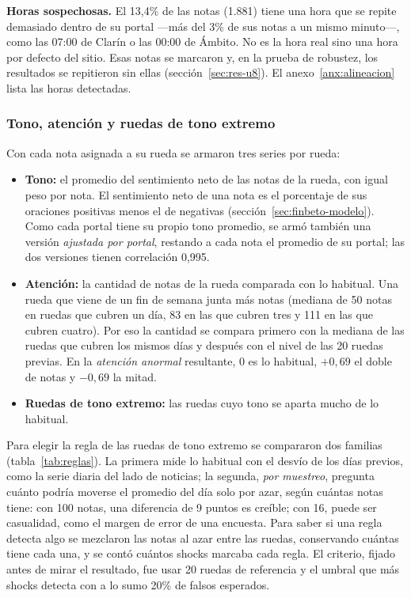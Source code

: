 \textbf{Horas sospechosas.} El 13,4\% de las notas (1.881) tiene una hora que se repite
demasiado dentro de su portal —más del 3\% de sus notas a un mismo minuto—, como las 07:00 de
Clarín o las 00:00 de Ámbito. No es la hora real sino una hora por defecto del sitio. Esas
notas se marcaron y, en la prueba de robustez, los resultados se repitieron sin ellas
(sección~\ref{sec:res-u8}). El anexo~\ref{anx:alineacion} lista las horas detectadas.

\subsubsection{Tono, atención y ruedas de tono extremo}
\label{sec:tono-rueda}

Con cada nota asignada a su rueda se armaron tres series por rueda:

\begin{itemize}
  \item \textbf{Tono:} el promedio del sentimiento neto de las notas de la rueda, con igual
        peso por nota. El sentimiento neto de una nota es el porcentaje de sus oraciones
        positivas menos el de negativas (sección~\ref{sec:finbeto-modelo}). Como cada portal
        tiene su propio tono promedio, se armó también una versión \textit{ajustada por
        portal}, restando a cada nota el promedio de su portal; las dos versiones tienen
        correlación 0,995.
  \item \textbf{Atención:} la cantidad de notas de la rueda comparada con lo habitual. Una
        rueda que viene de un fin de semana junta más notas (mediana de 50 notas en ruedas que
        cubren un día, 83 en las que cubren tres y 111 en las que cubren cuatro). Por eso la
        cantidad se compara primero con la mediana de las ruedas que cubren los mismos días y
        después con el nivel de las 20 ruedas previas. En la \textit{atención anormal}
        resultante, 0 es lo habitual, $+0{,}69$ el doble de notas y $-0{,}69$ la mitad.
  \item \textbf{Ruedas de tono extremo:} las ruedas cuyo tono se aparta mucho de lo habitual.
\end{itemize}

Para elegir la regla de las ruedas de tono extremo se compararon dos familias
(tabla~\ref{tab:reglas}). La primera mide lo habitual con el desvío de los días previos,
como la serie diaria del lado de noticias; la segunda, \textit{por muestreo}, pregunta cuánto
podría moverse el promedio del día solo por azar, según cuántas notas tiene: con 100 notas, una
diferencia de 9 puntos es creíble; con 16, puede ser casualidad, como el margen de error de una
encuesta. Para saber si una regla detecta algo se mezclaron las notas al azar entre las ruedas,
conservando cuántas tiene cada una, y se contó cuántos shocks marcaba cada regla. El criterio,
fijado antes de mirar el resultado, fue usar 20 ruedas de referencia y el umbral que más shocks
detecta con a lo sumo 20\% de falsos esperados.

